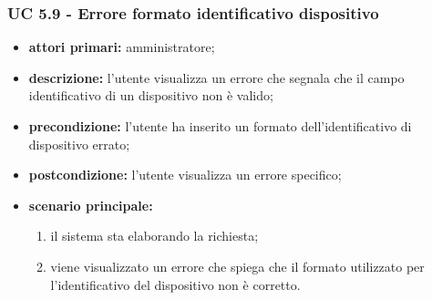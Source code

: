 			\subsubsection{UC 5.9 - Errore formato identificativo dispositivo}
			\begin{itemize}
				\item \textbf{attori primari:} amministratore;
				\item \textbf{descrizione:} l'utente visualizza un errore che segnala che il campo identificativo di un dispositivo non è valido;
				\item \textbf{precondizione:} l'utente ha inserito un formato dell'identificativo di dispositivo errato;
				\item \textbf{postcondizione:} l'utente visualizza un errore specifico;
				\item \textbf{scenario principale:}
				\begin{enumerate}
					\item il sistema sta elaborando la richiesta;
					\item viene visualizzato un errore che spiega che il formato utilizzato per l'identificativo del dispositivo non è corretto.
				\end{enumerate}
			\end{itemize}
